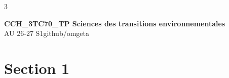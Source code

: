 \documentclass[12pt, a4paper]{article}
\newcommand{\mytitle}{CCH\_3TC70\_TP Sciences des transitions environnementales}
\newcommand{\myauthor}{github/omgeta}
\newcommand{\mydate}{AU 26-27 S1}
\begin{document}
\raggedright
\footnotesize
\begin{multicols*}{3}
\setlength{\premulticols}{1pt}
\setlength{\postmulticols}{1pt}
\setlength{\multicolsep}{1pt}
\setlength{\columnsep}{2pt}

{\normalsize{\textbf{\mytitle}}}\\
{\footnotesize{\mydate\hspace{2pt}\textemdash\hspace{2pt}\myauthor}}
\section{Section 1}
\end{multicols*}
\end{document}
